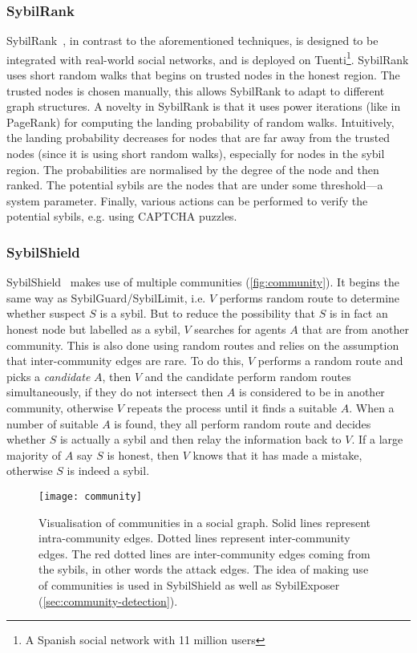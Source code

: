 \subsubsection{SybilRank}
SybilRank~\cite{cao2012aiding}, in contrast to the aforementioned techniques, is
designed to be integrated with real-world social networks, and is deployed on
Tuenti\footnote{A Spanish social network with 11 million users}. SybilRank uses
short random walks that begins on trusted nodes in the honest region. The
trusted nodes is chosen manually, this allows SybilRank to adapt to different
graph structures. A novelty in SybilRank is that it uses power iterations (like
in PageRank) for computing the landing probability of random walks. Intuitively,
the landing probability decreases for nodes that are far away from the trusted
nodes (since it is using short random walks), especially for nodes in the sybil
region. The probabilities are normalised by the degree of the node and then
ranked. The potential sybils are the nodes that are under some threshold---a
system parameter. Finally, various actions can be performed to verify the
potential sybils, e.g. using CAPTCHA puzzles.

\subsubsection{SybilShield}
SybilShield~\cite{shi2013sybilshield} makes use of multiple communities
(\autoref{fig:community}). It begins the same way as
SybilGuard/SybilLimit, i.e. $V$ performs random route to determine whether
suspect $S$ is a sybil. But to reduce the possibility that $S$ is in fact an
honest node but labelled as a sybil, $V$ searches for agents $A$ that are from
another community. This is also done using random routes and relies on the
assumption that inter-community edges are rare. To do this, $V$ performs a
random route and picks a \emph{candidate} $A$, then $V$ and the candidate
perform random routes simultaneously, if they do not intersect then $A$ is
considered to be in another community, otherwise $V$ repeats the process until
it finds a suitable $A$. When a number of suitable $A$ is found, they all
perform random route and decides whether $S$ is actually a sybil and then relay
the information back to $V$. If a large majority of $A$ say $S$ is honest, then
$V$ knows that it has made a mistake, otherwise $S$ is indeed a sybil.

\begin{figure}
  \centering
  \texttt{[image: community]}
  \caption{Visualisation of communities in a social graph. Solid lines represent
    intra-community edges. Dotted lines represent inter-community edges. The red
    dotted lines are inter-community edges coming from the sybils, in other
    words the attack edges. The idea of making use of communities is used in
    SybilShield as well as SybilExposer
    (\autoref{sec:community-detection}).}
  \label{fig:community}
\end{figure}

